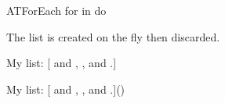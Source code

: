 \documentclass[a4paper, 11pt]{article}
\begin{document}
\begin{Macrodef}{ATForEach}{}{}
    for  in  do 

    The list is created on the fly then discarded.
\end{Macrodef}



\begin{PDExample}
    My list: [{ and }{, }{, and }{.}]{\fruit}

    My list: [{ and }{, }{, and }{.}]{(\ATCounter)~\fruit}
\end{PDExample}

\printindex
\end{document}
